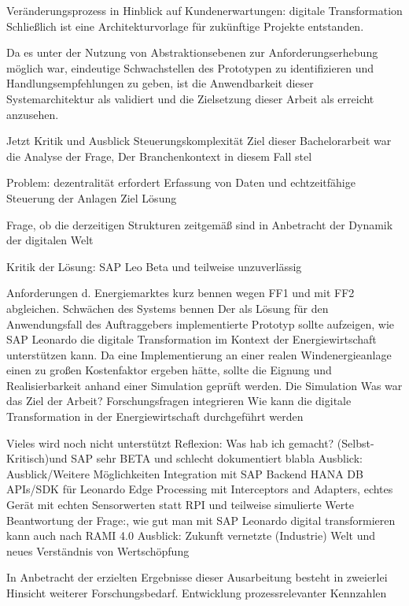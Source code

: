 Veränderungsprozess in Hinblick auf Kundenerwartungen: digitale Transformation
Schließlich ist eine Architekturvorlage für zukünftige Projekte entstanden. 


Da es unter der Nutzung von Abstraktionsebenen zur Anforderungserhebung möglich war, eindeutige Schwachstellen des Prototypen zu identifizieren und Handlungsempfehlungen zu geben, ist die Anwendbarkeit dieser Systemarchitektur als validiert und die Zielsetzung dieser Arbeit als erreicht anzusehen.

Jetzt Kritik 
und Ausblick
Steuerungskomplexität 
Ziel dieser Bachelorarbeit war die Analyse der Frage,  Der Branchenkontext in diesem Fall stel

Problem: dezentralität erfordert Erfassung von Daten und echtzeitfähige Steuerung der Anlagen 
Ziel
Lösung

Frage, ob die derzeitigen Strukturen zeitgemäß sind in Anbetracht der Dynamik der digitalen Welt

Kritik der Lösung: SAP Leo Beta und teilweise unzuverlässig

Anforderungen d. Energiemarktes kurz bennen wegen FF1 und mit FF2 abgleichen. Schwächen des Systems bennen 
Der als Lösung für den Anwendungsfall des Auftraggebers implementierte Prototyp sollte aufzeigen, wie SAP Leonardo die digitale Transformation im Kontext der Energiewirtschaft unterstützen kann. Da eine Implementierung an einer realen Windenergieanlage einen zu großen Kostenfaktor ergeben hätte, sollte die Eignung und Realisierbarkeit anhand einer Simulation geprüft werden. Die Simulation 
Was war das Ziel der Arbeit? Forschungsfragen integrieren
Wie kann die digitale Transformation in der Energiewirtschaft durchgeführt werden

Vieles wird noch nicht unterstützt
Reflexion:
Was hab ich gemacht? (Selbst-Kritisch)und SAP sehr BETA und schlecht dokumentiert blabla
\newline
Ausblick:
Ausblick/Weitere Möglichkeiten
Integration mit SAP Backend
HANA DB
APIs/SDK für Leonardo
Edge Processing mit Interceptors and Adapters, echtes Gerät mit echten Sensorwerten statt RPI und teilweise simulierte Werte
\newline
Beantwortung der Frage:, wie gut man mit SAP Leonardo digital transformieren kann auch nach RAMI 4.0 
Ausblick: Zukunft vernetzte (Industrie) Welt und neues Verständnis von Wertschöpfung


In Anbetracht der erzielten Ergebnisse dieser Ausarbeitung besteht in zweierlei Hinsicht weiterer Forschungsbedarf. 
Entwicklung prozessrelevanter Kennzahlen


\newpage
